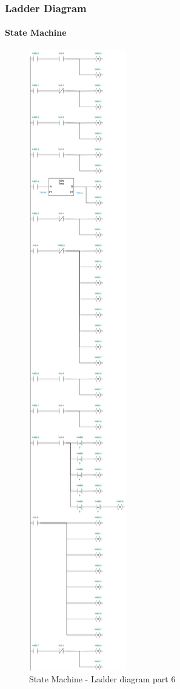 \documentclass[12pt]{beamer}
\begin{document}
\begin{frame}
\frametitle{Ladder Diagram}
\framesubtitle{State Machine}
\begin{figure}
    \centering
    \includegraphics[trim={0 43cm 0 55cm}, clip, scale=.5]{img/Ladder_diagram_2.jpg}
    \caption{State Machine - Ladder diagram part 6}
    \label{fig:ladder26}
\end{figure}
\end{frame}
\end{document}
